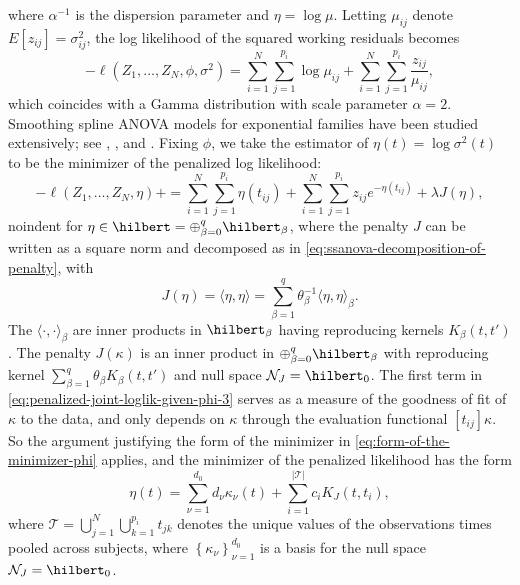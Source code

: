 \noindent
where $\alpha^{-1}$ is the dispersion parameter and $\eta = \log \mu$. Letting $\mu_{ij}$ denote $E\left[ z_{ij} \right] = \sigma_{ij}^2$, the log likelihood of the squared working residuals becomes 
\begin{equation} \label{eq:penalized-joint-loglik-given-phi-3}
-\ell\left( Z_1,\dots, Z_N, \phi, \sigma^2 \right) =  \sum_{i = 1}^N \sum_{j = 1}^{p_i} \log \mu_{ij}  + \sum_{i = 1}^N \sum_{j = 1}^{p_i} \frac {z_{ij}}{\mu_{ij}},
\end{equation}
\noindent
which coincides with a Gamma distribution with scale parameter $\alpha = 2$. Smoothing spline ANOVA models for exponential families have been studied extensively; see \cite{wahba1995smoothing}, \cite{wang1997grkpack}, and \cite{gu2013smoothing}. Fixing $\phi$, we take the estimator of $\eta\left(t\right) = \log\sigma^2\left(t\right)$ to be the minimizer of the penalized log likelihood:
\begin{equation} \label{eq:penalized-joint-loglik-given-phi-3}
-\ell\left( Z_1,\dots, Z_N,  \eta \right) + =  \sum_{i = 1}^N \sum_{j = 1}^{p_i} \eta\left(t_{ij}\right)  + \sum_{i = 1}^N \sum_{j = 1}^{p_i} z_{ij} e^{-\eta\left(t_{ij}\right)} + \lambda J\left(\eta\right),  
\end{equation}
noindent
for $\eta \in \hilbert = \oplus_{\beta = 0}^q \hilbert_\beta$, where the penalty $J$ can be written as a square norm and decomposed as in \eqref{eq:ssanova-decomposition-of-penalty}, with
\begin{equation*} 
J\left(\eta \right) = \langle \eta,\eta \rangle = \sum_{\beta = 1}^q \theta_\beta^{-1}\langle \eta,\eta \rangle_{\beta}.
\end{equation*}
\noindent 
The $\langle \cdot, \cdot \rangle_{\beta}$ are inner products in $\hilbert_\beta$ having reproducing kernels $K_\beta\left(t,t'\right)$. The penalty $J\left(\kappa\right)$ is an inner product in $\oplus_{\beta = 0}^q \hilbert_\beta$ with reproducing kernel $\sum_{\beta=1}^q \theta_\beta K_\beta\left(t, t'\right)$ and null space $\mathcal{N}_J = \hilbert_0$. The first term in \eqref{eq:penalized-joint-loglik-given-phi-3} serves as a measure of the goodness of fit of $\kappa$ to the data, and only depends on $\kappa$ through the evaluation functional $\left[t_{ij}\right]\kappa$. So the argument justifying the form of the minimizer in \eqref{eq:form-of-the-minimizer-phi} applies, and the minimizer of the penalized likelihood has the form 
\begin{equation} \label{eq:form-of-smoothing-spline-solution-kappa}
\eta\left( t \right) = \sum_{\nu = 1}^{d_0} d_\nu\kappa_\nu\left( t \right) + \sum_{i = 1}^{\vert \mathcal{T} \vert} c_i K_J\left( t, t_i \right),
\end{equation}  
\noindent
where $\mathcal{T} = \bigcup_{j=1}^N\bigcup_{k=1}^{p_i} t_{jk}$ denotes the unique values of the observations times pooled across subjects, where $\left\{\kappa_\nu \right\}_{\nu=1}^{d_0}$ is a basis for the null space $\mathcal{N}_J = \hilbert_0$. 

